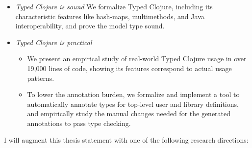 \begin{itemize}
  \item \emph{Typed Clojure is sound} We formalize Typed Clojure, including
    its characteristic features like hash-maps, multimethods, and Java interoperability,
    and prove the model type sound.
  \item \emph{Typed Clojure is practical} 
    \begin{itemize}
      \item We present an empirical study of real-world Typed Clojure usage
        in over 19,000 lines of code, showing its features correspond to actual usage patterns.
       \item %
         To lower the annotation burden,
          we formalize and implement a tool to automatically annotate types for top-level
          user and library definitions, and empirically study the manual changes needed for the generated annotations
          to pass type checking.
    \end{itemize}
\end{itemize}

I will augment this thesis statement with one of the following research directions:

